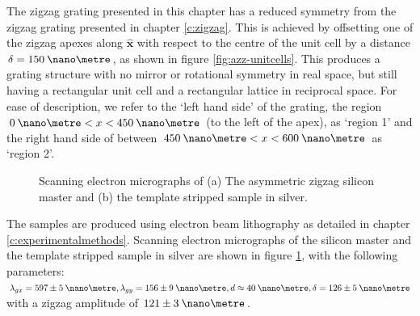The zigzag grating presented in this chapter has a reduced symmetry from the zigzag grating presented in chapter \ref{c:zigzag}. This is achieved by offsetting one of the zigzag apexes along $\hat{\mathbf{x}}$ with respect to the centre of the unit cell by a distance $\delta= 150 \:\nano\metre$, as shown in figure \ref{fig:azz-unitcells}. This produces a grating structure with no mirror or rotational symmetry in real space, but still having a rectangular unit cell and a rectangular lattice in reciprocal space. For ease of description, we refer to the `left hand side' of the grating, the region ${0\:\nano\metre<x<450\:\nano\metre}$ (to the left of the apex), as `region 1' and the right hand side of between $450\:\nano\metre<x<600\:\nano\metre$ as `region 2'.

\begin{figure}
\begin{center}
\end{center}
\caption[Scanning electron micrographs of an asymmetric zigzag silicon master and the template stripped sample in silver.]{Scanning electron micrographs of (a) The asymmetric zigzag silicon master and (b) the template stripped sample in silver.\label{fig:azz-sems}}
\end{figure}
The samples are produced using electron beam lithography as detailed in chapter \ref{c:experimentalmethods}. Scanning electron micrographs of the silicon master and the template stripped sample in silver are shown in figure \ref{fig:azz-sems}, with the following parameters: $\lambda_{gx}=597\pm 5\:\nano\metre, \lambda_{gy}=156\pm 9\:\nano\metre, d\approx 40\:\nano\metre, \delta=126\pm 5\:\nano\metre$ with a zigzag amplitude of $121\pm 3\:\nano\metre$. 

